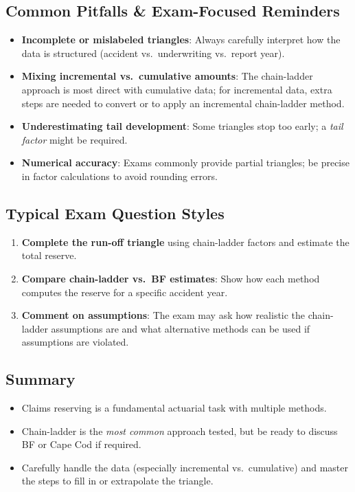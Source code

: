 \documentclass[13pt,a4paper]{article}
\begin{document}
\subsection{Common Pitfalls \& Exam-Focused Reminders}
\begin{itemize}
  \item \textbf{Incomplete or mislabeled triangles}: Always carefully interpret how the data is structured (accident vs.\ underwriting vs.\ report year).
  \item \textbf{Mixing incremental vs.\ cumulative amounts}: The chain-ladder approach is most direct with cumulative data; for incremental data, extra steps are needed to convert or to apply an incremental chain-ladder method.
  \item \textbf{Underestimating tail development}: Some triangles stop too early; a \emph{tail factor} might be required.
  \item \textbf{Numerical accuracy}: Exams commonly provide partial triangles; be precise in factor calculations to avoid rounding errors.
\end{itemize}

\subsection{Typical Exam Question Styles}
\begin{enumerate}
  \item \textbf{Complete the run-off triangle} using chain-ladder factors and estimate the total reserve.
  \item \textbf{Compare chain-ladder vs.\ BF estimates}: Show how each method computes the reserve for a specific accident year.
  \item \textbf{Comment on assumptions}: The exam may ask how realistic the chain-ladder assumptions are and what alternative methods can be used if assumptions are violated.
\end{enumerate}

\subsection{Summary}
\begin{itemize}
  \item Claims reserving is a fundamental actuarial task with multiple methods.
  \item Chain-ladder is the \emph{most common} approach tested, but be ready to discuss BF or Cape Cod if required.
  \item Carefully handle the data (especially incremental vs.\ cumulative) and master the steps to fill in or extrapolate the triangle.
\end{itemize}
\end{document}
